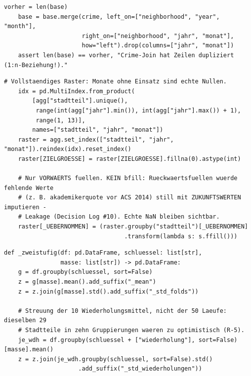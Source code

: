 \begin{lstlisting}[style=pythonstil,
  label={lst:joinhygiene},
  caption={Zeilenzahl vor und nach dem Verbund
           (\texttt{prep/s1\_daten.py}, Z.~643--647)}]
    vorher = len(base)
    base = base.merge(crime, left_on=["neighborhood", "year", "month"],
                      right_on=["neighborhood", "jahr", "monat"],
                      how="left").drop(columns=["jahr", "monat"])
    assert len(base) == vorher, "Crime-Join hat Zeilen dupliziert (1:n-Beziehung!)."
\end{lstlisting}



\begin{lstlisting}[style=pythonstil,
  label={lst:raster},
  caption={Vollständiges Raster und Vorwärtsfüllen
           (\texttt{prep/s2\_datensaetze.py}, Z.~220--235)}]
    # Vollstaendiges Raster: Monate ohne Einsatz sind echte Nullen.
    idx = pd.MultiIndex.from_product(
        [agg["stadtteil"].unique(),
         range(int(agg["jahr"].min()), int(agg["jahr"].max()) + 1),
         range(1, 13)],
        names=["stadtteil", "jahr", "monat"])
    raster = agg.set_index(["stadtteil", "jahr", "monat"]).reindex(idx).reset_index()
    raster[ZIELGROESSE] = raster[ZIELGROESSE].fillna(0).astype(int)

    # Nur VORWAERTS fuellen. KEIN bfill: Rueckwaertsfuellen wuerde fehlende Werte
    # (z. B. akademikerquote vor ACS 2014) still mit ZUKUNFTSWERTEN imputieren -
    # Leakage (Decision Log #10). Echte NaN bleiben sichtbar.
    raster[_UEBERNOMMEN] = (raster.groupby("stadtteil")[_UEBERNOMMEN]
                                  .transform(lambda s: s.ffill()))
\end{lstlisting}



\begin{lstlisting}[style=pythonstil,
  label={lst:streuung},
  caption={Zweistufige Mittelung über die zehn Wiederholungen
           (\texttt{vorpruefung/v1\_baselines.py}, Z.~181--206, gekürzt)}]
def _zweistufig(df: pd.DataFrame, schluessel: list[str],
                masse: list[str]) -> pd.DataFrame:
    g = df.groupby(schluessel, sort=False)
    z = g[masse].mean().add_suffix("_mean")
    z = z.join(g[masse].std().add_suffix("_std_folds"))

    # Streuung der 10 Wiederholungsmittel, nicht der 50 Laeufe: dieselben 29
    # Stadtteile in zehn Gruppierungen waeren zu optimistisch (R-5).
    je_wdh = df.groupby(schluessel + ["wiederholung"], sort=False)[masse].mean()
    z = z.join(je_wdh.groupby(schluessel, sort=False).std()
                     .add_suffix("_std_wiederholungen"))
\end{lstlisting}


